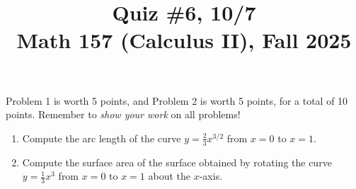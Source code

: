 \documentclass[11pt]{article}
\title{Quiz \#6, 10/7 \\ Math 157 (Calculus II), Fall 2025}
\date{}
\begin{document}
\maketitle

\thispagestyle{empty}

\vspace{-2cm}

Problem 1 is worth 5 points, and Problem 2 is worth 5 points, for a total of 10 points. Remember to \emph{show your work} on all problems!

\begin{enumerate}
\item Compute the arc length of the curve $y= \frac{2}{3} x^{3/2}$ from $x = 0$ to $x=1$.

\vspace{8.25cm}

\item Compute the surface area of the surface obtained by rotating the curve $y=\frac{1}{3}x^3$ from $x = 0$ to $x=1$ about the $x$-axis.

\end{enumerate}
\end{document}

